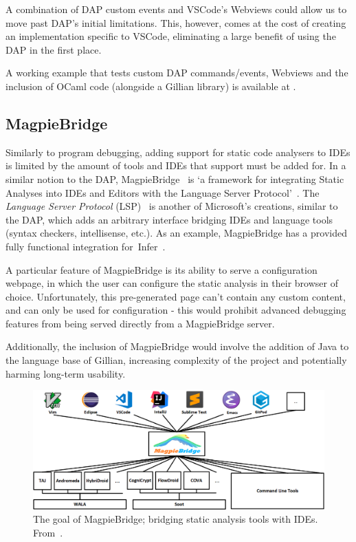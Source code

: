 \label{sec:background:extending-dap}
A combination of DAP custom events and VSCode's Webviews could allow us to move
past DAP's initial limitations. This, however, comes at the cost of creating an
implementation specific to VSCode, eliminating a large benefit of using the DAP
in the first place.

A working example that tests custom DAP commands/events, Webviews and the
inclusion of OCaml code (alongside a Gillian library) is available at
\cite{debugger-experiment}.

\subsection{MagpieBridge}

Similarly to program debugging, adding support for static code analysers to IDEs
is limited by the amount of tools and IDEs that support must be added for. In a
similar notion to the DAP, MagpieBridge~\cite{magpiebridge} is `a framework for
integrating Static Analyses into IDEs and Editors with the Language Server
Protocol'~\cite{magpiebridge-repo}. The \textit{Language Server Protocol}
(LSP)~\cite{lsp} is another of Microsoft's creations, similar to the DAP, which
adds an arbitrary interface bridging IDEs and language tools (syntax checkers,
intellisense, etc.). As an example, MagpieBridge has a provided fully
functional integration for~Infer~\cite{infer-ide}.

A particular feature of MagpieBridge is its ability to serve a configuration
webpage, in which the user can configure the static analysis in their browser
of choice. Unfortunately, this pre-generated page can't contain any custom
content, and can only be used for configuration - this would prohibit advanced
debugging features from being served directly from a MagpieBridge server.

Additionally, the inclusion of MagpieBridge would involve the addition of Java
to the language base of Gillian, increasing complexity of the project and
potentially harming long-term usability.


\begin{figure}
  \centering
  \includegraphics[width=\textwidth]{img/magpiebridge-goal.png}
  \caption{
    The goal of MagpieBridge; bridging static analysis tools with IDEs.
    From~\cite{magpiebridge-repo}.
  }
  \label{fig:magpiebridge-goal}
\end{figure}
